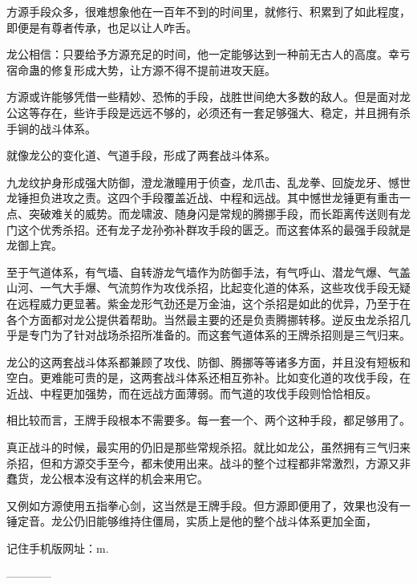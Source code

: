 \begin{this_body}
方源手段众多，很难想象他在一百年不到的时间里，就修行、积累到了如此程度，即便是有尊者传承，也足以让人咋舌。

龙公相信：只要给予方源充足的时间，他一定能够达到一种前无古人的高度。幸亏宿命蛊的修复形成大势，让方源不得不提前进攻天庭。

方源或许能够凭借一些精妙、恐怖的手段，战胜世间绝大多数的敌人。但是面对龙公这等存在，些许手段是远远不够的，必须还有一套足够强大、稳定，并且拥有杀手锏的战斗体系。

就像龙公的变化道、气道手段，形成了两套战斗体系。

九龙纹护身形成强大防御，澄龙澈瞳用于侦查，龙爪击、乱龙拳、回旋龙牙、憾世龙锤担负进攻之责。这四个手段覆盖近战、中程和远战。其中憾世龙锤更有重击一点、突破难关的威势。而龙啸波、随身闪是常规的腾挪手段，而长距离传送则有龙门这个优秀杀招。还有龙子龙孙弥补群攻手段的匮乏。而这套体系的最强手段就是龙御上宾。

至于气道体系，有气墙、自转游龙气墙作为防御手法，有气呼山、潜龙气爆、气盖山河、一气大手爆、气流剪作为攻伐杀招，比起变化道的体系，这些攻伐手段无疑在远程威力更显著。紫金龙形气劲还是万金油，这个杀招是如此的优异，乃至于在各个方面都对龙公提供着帮助。当然最主要的还是负责腾挪转移。逆反虫龙杀招几乎是专门为了针对战场杀招所准备的。而这套气道体系的王牌杀招则是三气归来。

龙公的这两套战斗体系都兼顾了攻伐、防御、腾挪等等诸多方面，并且没有短板和空白。更难能可贵的是，这两套战斗体系还相互弥补。比如变化道的攻伐手段，在近战、中程更加强势，而在远战方面薄弱。而气道的攻伐手段则恰恰相反。

相比较而言，王牌手段根本不需要多。每一套一个、两个这种手段，都足够用了。

真正战斗的时候，最实用的仍旧是那些常规杀招。就比如龙公，虽然拥有三气归来杀招，但和方源交手至今，都未使用出来。战斗的整个过程都非常激烈，方源又非蠢货，龙公根本没有这样的机会来用它。

又例如方源使用五指拳心剑，这当然是王牌手段。但方源即便用了，效果也没有一锤定音。龙公仍旧能够维持住僵局，实质上是他的整个战斗体系更加全面，

记住手机版网址：m.

------------

\end{this_body}

